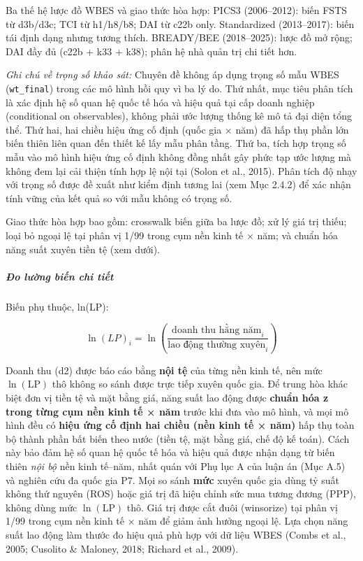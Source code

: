 \documentclass[
  a4paper,
  13pt]{extreport}
\begin{document}
Ba thế hệ lược đồ WBES và giao thức hòa hợp: PICS3 (2006--2012): biến
FSTS từ d3b/d3c; TCI từ h1/h8/b8; DAI từ c22b only. Standardized
(2013--2017): biến tái định dạng nhưng tương thích. BREADY/BEE
(2018--2025): lược đồ mở rộng; DAI đầy đủ (c22b + k33 + k38); phân hệ
nhà quản trị chi tiết hơn.

\emph{Ghi chú về trọng số khảo sát:} Chuyên đề không áp dụng trọng số
mẫu WBES (\texttt{wt\_final}) trong các mô hình hồi quy vì ba lý do. Thứ
nhất, mục tiêu phân tích là xác định hệ số quan hệ quốc tế hóa và hiệu
quả tại cấp doanh nghiệp (conditional on observables), không phải ước
lượng thống kê mô tả đại diện tổng thể. Thứ hai, hai chiều hiệu ứng cố
định (quốc gia × năm) đã hấp thụ phần lớn biến thiên liên quan đến thiết
kế lấy mẫu phân tầng. Thứ ba, tích hợp trọng số mẫu vào mô hình hiệu ứng
cố định không đồng nhất gây phức tạp ước lượng mà không đem lại cải
thiện tính hợp lệ nội tại (Solon et al., 2015). Phân tích độ nhạy với
trọng số được đề xuất như kiểm định tương lai (xem Mục 2.4.2) để xác
nhận tính vững của kết quả so với mẫu không có trọng số.

Giao thức hòa hợp bao gồm: crosswalk biến giữa ba lược đồ; xử lý giá trị
thiếu; loại bỏ ngoại lệ tại phân vị 1/99 trong cụm nền kinh tế × năm; và
chuẩn hóa năng suất xuyên tiền tệ (xem dưới).

\hypertarget{ux111o-lux1b0ux1eddng-biux1ebfn-chi-tiux1ebft}{%
\subparagraph{Đo lường biến chi
tiết}\label{ux111o-lux1b0ux1eddng-biux1ebfn-chi-tiux1ebft}}

Biến phụ thuộc, ln(LP):

\[\ln(LP)_i = \ln\left(\frac{\text{doanh thu hằng năm}_i}{\text{lao động thường xuyên}_i}\right)\]

Doanh thu (d2) được báo cáo bằng \textbf{nội tệ} của từng nền kinh tế,
nên mức \(\ln(\mathrm{LP})\) thô không so sánh được trực tiếp xuyên quốc
gia. Để trung hòa khác biệt đơn vị tiền tệ và mặt bằng giá, năng suất
lao động được \textbf{chuẩn hóa z trong từng cụm nền kinh tế × năm}
trước khi đưa vào mô hình, và mọi mô hình đều có \textbf{hiệu ứng cố
định hai chiều (nền kinh tế × năm)} hấp thụ toàn bộ thành phần bất biến
theo nước (tiền tệ, mặt bằng giá, chế độ kế toán). Cách này bảo đảm hệ
số quan hệ quốc tế hóa và hiệu quả được nhận dạng từ biến thiên
\emph{nội bộ} nền kinh tế--năm, nhất quán với Phụ lục A của luận án (Mục
A.5) và nghiên cứu đa quốc gia P7. Mọi so sánh \textbf{mức} xuyên quốc
gia dùng tỷ suất không thứ nguyên (ROS) hoặc giá trị đã hiệu chỉnh sức
mua tương đương (PPP), không dùng mức \(\ln(\mathrm{LP})\) thô. Giá trị
được cắt đuôi (winsorize) tại phân vị 1/99 trong cụm nền kinh tế × năm
để giảm ảnh hưởng ngoại lệ. Lựa chọn năng suất lao động làm thước đo
hiệu quả phù hợp với dữ liệu WBES (Combs et al., 2005; Cusolito \&
Maloney, 2018; Richard et al., 2009).
\end{document}
